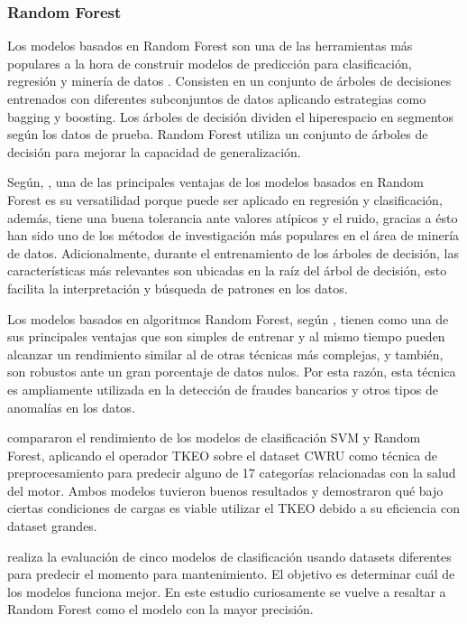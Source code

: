 \documentclass[11pt,a4paper,spanish]{book}
\numberwithin{equation}{chapter}
\numberwithin{figure}{chapter}
\begin{document}
\subsubsection{Random Forest}


Los modelos basados en Random Forest son una de las herramientas más populares a la hora de construir modelos de predicción para clasificación, regresión y minería de datos \cite{rushall2013rf}. Consisten en un conjunto de árboles de decisiones entrenados con diferentes subconjuntos de datos aplicando estrategias como bagging y boosting. Los árboles de decisión dividen el hiperespacio en segmentos según los datos de prueba. Random Forest utiliza un conjunto de árboles de decisión para mejorar la capacidad de generalización.  


Según, \cite{salman2024rf}, una de las principales ventajas de los modelos basados en Random Forest es su versatilidad porque puede ser aplicado en regresión y clasificación,  además, tiene una buena tolerancia ante valores atípicos y el ruido, gracias a ésto han sido uno de los métodos de investigación más populares en el área de minería de datos. Adicionalmente, durante el entrenamiento de los árboles de decisión, las características más relevantes son ubicadas en la raíz del árbol de decisión, esto facilita la interpretación y búsqueda de patrones en los datos. 


Los modelos basados en algoritmos Random Forest, según \cite{canovas2017random}, tienen como una de sus principales ventajas que son simples de entrenar y al mismo tiempo pueden alcanzar un rendimiento similar al de otras técnicas más complejas, y también, son robustos ante un gran porcentaje de datos nulos. Por esta razón, esta técnica es ampliamente utilizada en la detección de fraudes bancarios y otros tipos de anomalías en los datos. 


\cite{yu2025tkeo} compararon el rendimiento de los modelos de clasificación SVM  y Random Forest, aplicando el operador TKEO sobre el dataset CWRU como técnica de preprocesamiento para predecir alguno de 17 categorías relacionadas con la salud del motor. Ambos modelos tuvieron buenos resultados y demostraron qué bajo ciertas condiciones de cargas es viable utilizar el TKEO debido a su eficiencia con dataset grandes.


\cite{sharma2022predictive} realiza la evaluación de cinco modelos de clasificación usando datasets diferentes para predecir el momento para mantenimiento. El objetivo es determinar cuál de los modelos funciona mejor. En este estudio curiosamente se vuelve a resaltar a Random Forest como el modelo con la mayor precisión.
\end{document}
